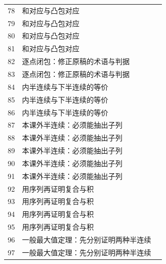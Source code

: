 \documentclass[11pt,a4paper]{article}
\theoremstyle{definition}\newtheorem{definition}{定义}\newtheorem{example}{例}
\begin{document}
\begin{longtable}{r p{.66\linewidth} r}
78 & 和对应与凸包对应 & \pageref{g:108:77}\\

79 & 和对应与凸包对应 & \pageref{g:108:77}\\

80 & 和对应与凸包对应 & \pageref{g:108:77}\\

81 & 和对应与凸包对应 & \pageref{g:108:77}\\

82 & 逐点闭包：修正原稿的术语与判据 & \pageref{g:108:82}\\

83 & 逐点闭包：修正原稿的术语与判据 & \pageref{g:108:82}\\

84 & 内半连续与下半连续的等价 & \pageref{g:108:84}\\

85 & 内半连续与下半连续的等价 & \pageref{g:108:84}\\

86 & 内半连续与下半连续的等价 & \pageref{g:108:84}\\

87 & 本课外半连续：必须能抽出子列 & \pageref{g:108:87}\\

88 & 本课外半连续：必须能抽出子列 & \pageref{g:108:87}\\

89 & 本课外半连续：必须能抽出子列 & \pageref{g:108:87}\\

90 & 本课外半连续：必须能抽出子列 & \pageref{g:108:87}\\

91 & 本课外半连续：必须能抽出子列 & \pageref{g:108:87}\\

92 & 用序列再证明复合与积 & \pageref{g:108:92}\\

93 & 用序列再证明复合与积 & \pageref{g:108:92}\\

94 & 用序列再证明复合与积 & \pageref{g:108:92}\\

95 & 用序列再证明复合与积 & \pageref{g:108:92}\\

96 & 一般最大值定理：先分别证明两种半连续 & \pageref{g:108:96}\\

97 & 一般最大值定理：先分别证明两种半连续 & \pageref{g:108:96}\\


\end{longtable}
\end{document}
